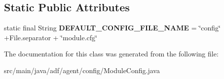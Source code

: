 \subsection*{Static Public Attributes}
\begin{DoxyCompactItemize}
\item 
\hypertarget{classadf_1_1agent_1_1config_1_1ModuleConfig_ab5bcec06ba1b09f1bb48b59c5fa58ac8}{}\label{classadf_1_1agent_1_1config_1_1ModuleConfig_ab5bcec06ba1b09f1bb48b59c5fa58ac8} 
static final String {\bfseries D\+E\+F\+A\+U\+L\+T\+\_\+\+C\+O\+N\+F\+I\+G\+\_\+\+F\+I\+L\+E\+\_\+\+N\+A\+ME} = \char`\"{}config\char`\"{} +File.\+separator + \char`\"{}module.\+cfg\char`\"{}
\end{DoxyCompactItemize}


The documentation for this class was generated from the following file\+:\begin{DoxyCompactItemize}
\item 
src/main/java/adf/agent/config/Module\+Config.\+java\end{DoxyCompactItemize}
